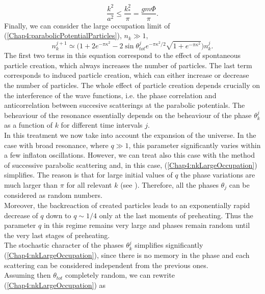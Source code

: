 \documentclass[11pt,a4paper,twoside]{book}
\begin{document}
\begin{equation}
\label{Chap4:resonanceBand}
\frac{k^{2}}{a^{2}} \le \frac{k_{*}^{2}}{\pi} = \frac{gm\Phi}{\pi}.
\end{equation}
Finally, we can consider the large occupation limit of (\ref{Chap4:parabolicPotentialParticles}), $ n_{k} \gg 1 $,
\begin{equation}
	\label{Chap4:nkLargeOccupation}
	n_{k}^{j+1} \simeq \Bigg(1 + 2 e^{-\pi\kappa^{2}} -2\sin\theta^{j}_{tot}e^{-\pi\kappa^{2}/2}\sqrt{1+e^{-\pi\kappa^{2}}}\Bigg)n_{k}^{j}.
\end{equation}
The first two terms in this equation correspond to the effect of spontaneous particle creation, which always increases the number of particles. The last term corresponds to induced particle creation, which can either increase or decrease the number of particles. The whole effect of particle creation depends crucially on the interference of the wave functions, i.e. the phase correlation and anticorrelation between succesive scatterings at the parabolic potentials. The beheaviour of the resonance essentially depends on the beheaviour of the phase $ \theta_{k}^{j} $ as a function of $ k $ for different time intervals $ j $.\\
In this treatment we now take into account the expansion of the universe. In the case with broad resonance, where $ q\gg 1 $, this parameter significantly varies within a few inflaton oscillations. However, we can treat also this case with the method of successive parabolic scattering and, in this case, (\ref{Chap4:nkLargeOccupation}) simplifies. The reason is that for large initial values of $ q $ the phase variations are much larger than $ \pi  $ for all relevant $ k $ (see \cite{Chap4:LindePreheatingModel}). Therefore, all the phases $ \theta_{j} $ can be considered as random numbers.\\
Moreover, the backreaction of created particles leads to an exponentially rapid decrease of $ q $ down to $ q \sim 1/4 $ only at the last moments of preheating. Thus the parameter $ q $ in this regime remains very large and phases remain random until the very last stages of preheating.\\
The stochastic character of the phases $ \theta_{k}^{j} $ simplifies significantly (\ref{Chap4:nkLargeOccupation}), since there is no memory in the phase and each scattering can be considered  independent from the previous ones.\\ 
Assuming then $\theta_{tot}$ completely random, we can rewrite (\ref{Chap4:nkLargeOccupation}) as
\end{document}
